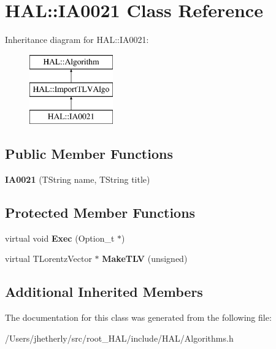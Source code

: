 \hypertarget{class_h_a_l_1_1_i_a0021}{\section{H\-A\-L\-:\-:I\-A0021 Class Reference}
\label{class_h_a_l_1_1_i_a0021}
}
Inheritance diagram for H\-A\-L\-:\-:I\-A0021\-:\begin{figure}[H]
\begin{center}
\leavevmode
\includegraphics[height=3.000000cm]{class_h_a_l_1_1_i_a0021}
\end{center}
\end{figure}
\subsection*{Public Member Functions}
\begin{DoxyCompactItemize}
\item 
\hypertarget{class_h_a_l_1_1_i_a0021_aea44683ea1913cda29acdc00a8831c2d}{{\bfseries I\-A0021} (T\-String name, T\-String title)}\label{class_h_a_l_1_1_i_a0021_aea44683ea1913cda29acdc00a8831c2d}

\end{DoxyCompactItemize}
\subsection*{Protected Member Functions}
\begin{DoxyCompactItemize}
\item 
\hypertarget{class_h_a_l_1_1_i_a0021_ade49ac03e72a5ca25426efcc5c882e31}{virtual void {\bfseries Exec} (Option\-\_\-t $\ast$)}\label{class_h_a_l_1_1_i_a0021_ade49ac03e72a5ca25426efcc5c882e31}

\item 
\hypertarget{class_h_a_l_1_1_i_a0021_a80de69cebc7163a2ac15c0690f655b66}{virtual T\-Lorentz\-Vector $\ast$ {\bfseries Make\-T\-L\-V} (unsigned)}\label{class_h_a_l_1_1_i_a0021_a80de69cebc7163a2ac15c0690f655b66}

\end{DoxyCompactItemize}
\subsection*{Additional Inherited Members}


The documentation for this class was generated from the following file\-:\begin{DoxyCompactItemize}
\item 
/\-Users/jhetherly/src/root\-\_\-\-H\-A\-L/include/\-H\-A\-L/Algorithms.\-h\end{DoxyCompactItemize}
